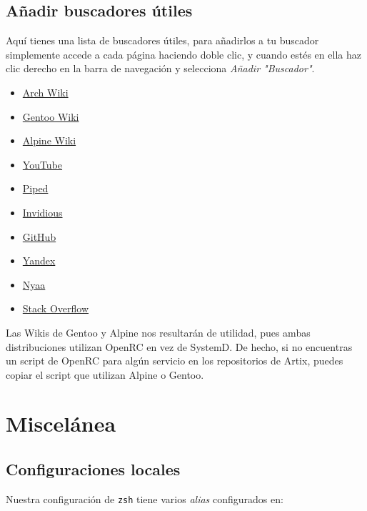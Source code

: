 \documentclass[11pt]{article}
\begin{document}
\subsection{Añadir buscadores útiles}

Aquí tienes una lista de buscadores útiles, para añadirlos a tu buscador simplemente accede a cada página haciendo doble clic, y cuando estés en ella haz clic derecho en la barra de navegación y selecciona \textit{Añadir "Buscador"}.

\begin{multicols}{5}
\scriptsize
\begin{itemize}
\setlength\itemindent{-0.75em}
\setlength\itemsep{-0.35em}
\item \href{https://wiki.archlinux.org/}{Arch Wiki}
\item \href{https://wiki.gentoo.org/wiki/Main_Page}{Gentoo Wiki}
\item \href{https://wiki.alpinelinux.org/wiki/Main_Page}{Alpine Wiki}
\item \href{https://www.youtube.com/}{YouTube}
\item \href{https://nyc1.pi.ggtyler.dev/trending}{Piped}
\item \href{https://iv.ggtyler.dev/feed/popular}{Invidious}
\item \href{https://github.com/}{GitHub}
\item \href{https://yandex.com/}{Yandex}
\item \href{https://nyaa.si/}{Nyaa}
\item \href{https://stackoverflow.com/}{Stack Overflow}
\end{itemize}
\end{multicols}

Las Wikis de Gentoo y Alpine nos resultarán de utilidad, pues ambas distribuciones utilizan OpenRC en vez de SystemD. De hecho, si no encuentras un script de OpenRC para algún servicio en los repositorios de Artix, puedes copiar el script que utilizan Alpine o Gentoo.

\section{Miscelánea}

\subsection*{Configuraciones locales}

Nuestra configuración de \texttt{zsh} tiene varios \emph{alias} configurados en:
\end{document}
